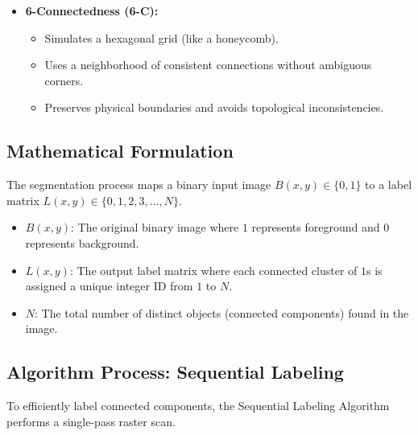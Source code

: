 \documentclass[12pt]{article}
\begin{document}
\begin{itemize}
    \item \textbf{6-Connectedness (6-C):}
          \begin{itemize}
              \item Simulates a hexagonal grid (like a honeycomb).
              \item Uses a neighborhood of consistent connections without ambiguous corners.
              \item Preserves physical boundaries and avoids topological inconsistencies.
          \end{itemize}
\end{itemize}

\subsection{Mathematical Formulation}
The segmentation process maps a binary input image $B(x,y) \in \{0,1\}$ to a label matrix $L(x,y) \in \{0,1,2,3,\dots,N\}$.

\begin{itemize}
    \item $B(x,y)$: The original binary image where $1$ represents foreground and $0$ represents background.

    \item $L(x,y)$: The output label matrix where each connected cluster of $1$s is assigned a unique integer ID from $1$ to $N$.

    \item $N$: The total number of distinct objects (connected components) found in the image.
\end{itemize}


\subsection{Algorithm Process: Sequential Labeling}
To efficiently label connected components, the Sequential Labeling Algorithm performs a single-pass raster scan.
\end{document}
